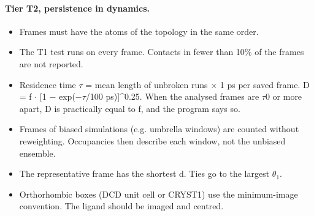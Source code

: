 \documentclass[journal=jcisd8,manuscript=suppinfo]{achemso}
\begin{document}
\begin{singlespace}
\paragraph{Tier T2, persistence in dynamics.}
\begin{itemize}[nosep,leftmargin=*]
\item Frames must have the atoms of the topology in the same order.
\item The T1 test runs on every frame. Contacts in fewer than 10\% of the frames are not reported.
\item Residence time $\tau$ = mean length of unbroken runs $\times$ 1 ps per saved frame. D = f $\cdot$ [1 $-$ exp($-\tau$/100 ps)]\^{}0.25. When the analysed frames are $\tau$0 or more apart, D is practically equal to f, and the program says so.
\item Frames of biased simulations (e.g. umbrella windows) are counted without reweighting. Occupancies then describe each window, not the unbiased ensemble.
\item The representative frame has the shortest d. Ties go to the largest $\theta_1$.
\item Orthorhombic boxes (DCD unit cell or CRYST1) use the minimum-image convention. The ligand should be imaged and centred.
\end{itemize}

\end{singlespace}
\end{document}
